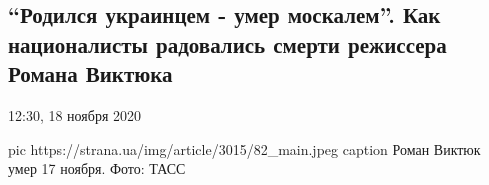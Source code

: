  
 
 

\subsection{\enquote{Родился украинцем - умер москалем}. Как националисты радовались смерти режиссера Романа Виктюка}

12:30, 18 ноября 2020 

\ifcmt
pic https://strana.ua/img/article/3015/82_main.jpeg
caption Роман Виктюк умер 17 ноября. Фото: ТАСС 
\fi
